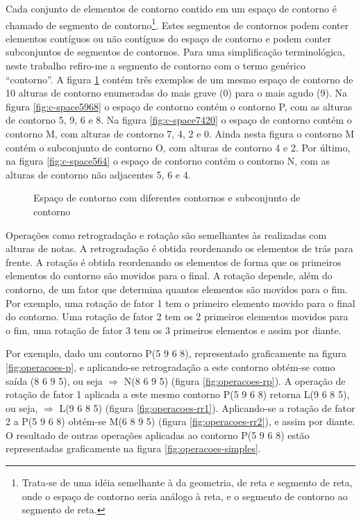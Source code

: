 Cada conjunto de elementos de contorno contido em um espaço de
contorno é chamado de segmento de contorno\footnote{Trata-se de uma
  idéia semelhante à da geometria, de reta e segmento de reta, onde o
  espaço de contorno seria análogo à reta, e o segmento de contorno ao
  segmento de reta.}. Estes segmentos de contornos podem conter
elementos contíguos ou não contíguos do espaço de contorno e podem
conter subconjuntos de segmentos de contornos. Para uma simplificação
terminológica, neste trabalho refiro-me a segmento de contorno com o
termo genérico ``contorno''. A figura \ref{fig:c-space} contém três
exemplos de um mesmo espaço de contorno de 10 alturas de contorno
enumeradas do mais grave (0) para o mais agudo (9). Na figura
\ref{fig:c-space5968} o espaço de contorno contém o contorno P, com as
alturas de contorno 5, 9, 6 e 8. Na figura \ref{fig:c-space7420} o
espaço de contorno contém o contorno M, com alturas de contorno 7, 4,
2 e 0. Ainda nesta figura o contorno M contém o subconjunto de
contorno O, com alturas de contorno 4 e 2. Por último, na figura
\ref{fig:c-space564} o espaço de contorno contém o contorno N, com as
alturas de contorno não adjacentes 5, 6 e 4.

\begin{figure}
  \centering

  \caption{Espaço de contorno com diferentes contornos e subconjunto
    de contorno}
  \label{fig:c-space}
\end{figure}

Operações como retrogradação e rotação são semelhantes às realizadas
com alturas de notas. A retrogradação é obtida reordenando os
elementos de trás para frente. A rotação é obtida reordenando os
elementos de forma que os primeiros elementos do contorno são movidos
para o final. A rotação depende, além do contorno, de um fator que
determina quantos elementos são movidos para o fim. Por exemplo, uma
rotação de fator 1 tem o primeiro elemento movido para o final do
contorno. Uma rotação de fator 2 tem os 2 primeiros elementos movidos
para o fim, uma rotação de fator 3 tem os 3 primeiros elementos e
assim por diante.

Por exemplo, dado um contorno P(5 9 6 8), representado graficamente na
figura \ref{fig:operacoes-p}, e aplicando-se retrogradação a este
contorno obtém-se como saída (8 6 9 5), ou seja  $\Rightarrow$ N(8 6 9 5) (figura \ref{fig:operacoes-rp}). A
operação de rotação de fator 1 aplicada a este mesmo contorno P(5 9 6
8) retorna L(9 6 8 5), ou seja,  $\Rightarrow$
L(9 6 8 5) (figura \ref{fig:operacoes-rr1}). Aplicando-se a rotação de
fator 2 a P(5 9 6 8) obtém-se M(6 8 9 5) (figura
\ref{fig:operacoes-rr2}), e assim por diante. O resultado de outras
operações aplicadas ao contorno P(5 9 6 8) estão representadas
graficamente na figura \ref{fig:operacoes-simples}.

